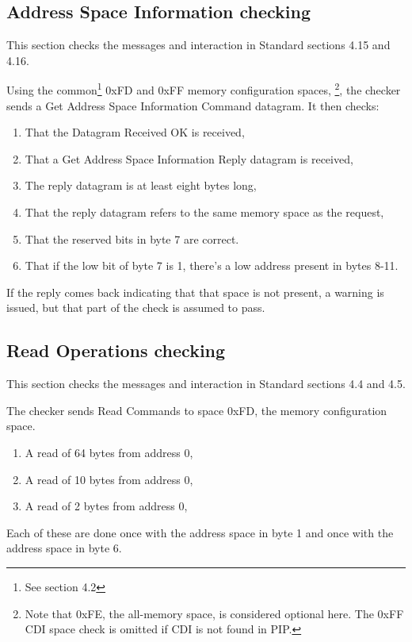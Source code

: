 \subsection{Address Space Information checking}

This section checks the messages and interaction in Standard sections 4.15 and 4.16.

Using the common\footnote{See section 4.2}
0xFD and 0xFF memory configuration spaces,
\footnote{Note that 0xFE, the all-memory space, is considered optional here. The 0xFF CDI 
space check is omitted if CDI is not found in PIP.}, 
the checker sends a Get Address Space Information Command datagram.  It then checks:
\begin{enumerate}
\item That the Datagram Received OK is received,
\item That a Get Address Space Information Reply datagram is received,
\item The reply datagram is at least eight bytes long,
\item That the reply datagram refers to the same memory space as the request,
\item That the reserved bits in byte 7 are correct.
\item That if the low bit of byte 7 is 1, there's a low address present in bytes 8-11.
\end{enumerate}

If the reply comes back indicating that that space is not present, 
a warning is issued, but that part of the check is assumed to pass.

\subsection{Read Operations checking}

This section checks the messages and interaction in Standard sections 4.4 and 4.5.

The checker sends Read Commands to space 0xFD, the memory configuration space.

\begin{enumerate}
\item A read of 64 bytes from address 0,
\item A read of 10 bytes from address 0,
\item A read of 2 bytes from address 0,
\end{enumerate}

Each of these are done once with the address space in byte 1 
and once with the address space in byte 6.

